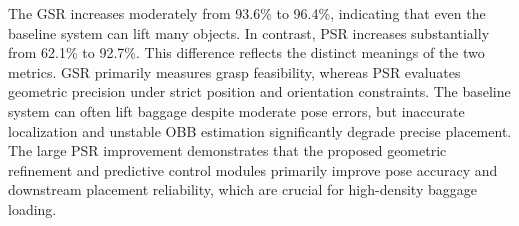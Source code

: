 The GSR increases moderately from 93.6\% to 96.4\%, indicating that even the baseline system can lift many objects. In contrast, PSR increases substantially from 62.1\% to 92.7\%. This difference reflects the distinct meanings of the two metrics. GSR primarily measures grasp feasibility, whereas PSR evaluates geometric precision under strict position and orientation constraints. The baseline system can often lift baggage despite moderate pose errors, but inaccurate localization and unstable OBB estimation significantly degrade precise placement. The large PSR improvement demonstrates that the proposed geometric refinement and predictive control modules primarily improve pose accuracy and downstream placement reliability, which are crucial for high-density baggage loading.